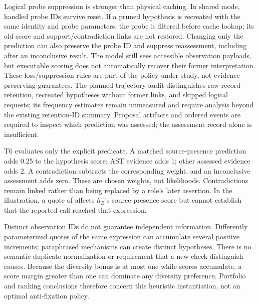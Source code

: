 \documentclass[letterpaper,journal]{IEEEtran}
\newcommand{\code}[1]{\texttt{\detokenize{#1}}}
\begin{document}
Logical probe suppression is stronger than physical caching. In shared mode, handled probe IDs survive reset. If a pruned hypothesis is recreated with the same identity and probe parameters, the probe is filtered before cache lookup; its old score and support/contradiction links are not restored. Changing only the prediction can also preserve the probe ID and suppress reassessment, including after an inconclusive result. The model still sees accessible observation payloads, but executable scoring does not automatically recover their former interpretation. These loss/suppression rules are part of the policy under study, not evidence-preserving guarantees. The planned trajectory audit distinguishes raw-record retention, recreated hypotheses without former links, and skipped logical requests; its frequency estimates remain unmeasured and require analysis beyond the existing retention-ID summary. Proposal artifacts and ordered events are required to inspect which prediction was assessed; the assessment record alone is insufficient.

T6 evaluates only the explicit predicate. A matched source-presence prediction adds 0.25 to the hypothesis score; AST evidence adds 1; other assessed evidence adds 2. A contradiction subtracts the corresponding weight, and an inconclusive assessment adds zero. These are chosen weights, not likelihoods. Contradictions remain linked rather than being replaced by a role's later assertion. In the illustration, a quote of \code{or True} affects $h_B$'s source-presence score but cannot establish that the reported call reached that expression.

Distinct observation IDs do not guarantee independent information. Differently parameterized quotes of the same expression can accumulate several positive increments; paraphrased mechanisms can create distinct hypotheses. There is no semantic duplicate normalization or requirement that a new check distinguish causes. Because the diversity bonus is at most one while scores accumulate, a score margin greater than one can dominate any diversity preference. Portfolio and ranking conclusions therefore concern this heuristic instantiation, not an optimal anti-fixation policy.
\end{document}
